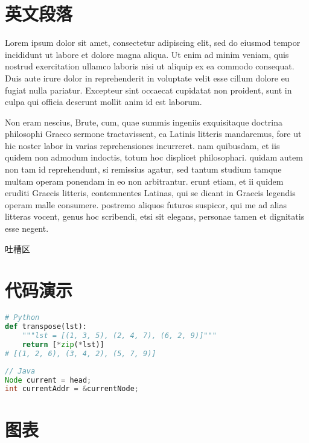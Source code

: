 \documentclass[12pt,a4paper]{report}
\begin{document}
\chapter{英文段落}
\setlength{\parindent}{0em}
Lorem ipsum dolor sit amet, consectetur adipiscing elit, sed do eiusmod tempor incididunt ut labore et dolore magna aliqua. Ut enim ad minim veniam, quis nostrud exercitation ullamco laboris nisi ut aliquip ex ea commodo consequat. Duis aute irure dolor in reprehenderit in voluptate velit esse cillum dolore eu fugiat nulla pariatur. Excepteur sint occaecat cupidatat non proident, sunt in culpa qui officia deserunt mollit anim id est laborum.\par\bigbreak
Non eram nescius, Brute, cum, quae summis ingeniis exquisitaque doctrina philosophi Graeco sermone tractavissent, ea Latinis litteris mandaremus, fore ut hic noster labor in varias reprehensiones incurreret. nam quibusdam, et iis quidem non admodum indoctis, totum hoc displicet philosophari. quidam autem non tam id reprehendunt, si remissius agatur, sed tantum studium tamque multam operam ponendam in eo non arbitrantur. erunt etiam, et ii quidem eruditi Graecis litteris, contemnentes Latinas, qui se dicant in Graecis legendis operam malle consumere. postremo aliquos futuros suspicor, qui me ad alias litteras vocent, genus hoc scribendi, etsi sit elegans, personae tamen et dignitatis esse negent.

\begin{framed}
  吐槽区
\end{framed}

\chapter{代码演示}
\begin{lstlisting}[language=Python]
# Python
def transpose(lst):
    """lst = [(1, 3, 5), (2, 4, 7), (6, 2, 9)]"""
    return [*zip(*lst)]
# [(1, 2, 6), (3, 4, 2), (5, 7, 9)]
\end{lstlisting}

\begin{lstlisting}[language=Java]
// Java
Node current = head;
int currentAddr = &currentNode;
\end{lstlisting}

\chapter{图表}
\par\bigbreak
\end{document}
